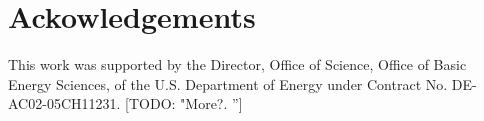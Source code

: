 \documentclass[preprint]{iucr}
\newcommand{\todo}[1]{{\color{red}[TODO: "#1'']}}
\begin{document}
\section{Ackowledgements}       
 
 
This work was supported by the Director, Office of Science, Office of Basic Energy Sciences, of the U.S. Department of Energy under Contract No. DE-AC02-05CH11231.
 \todo{More?. }
 
\end{document}
